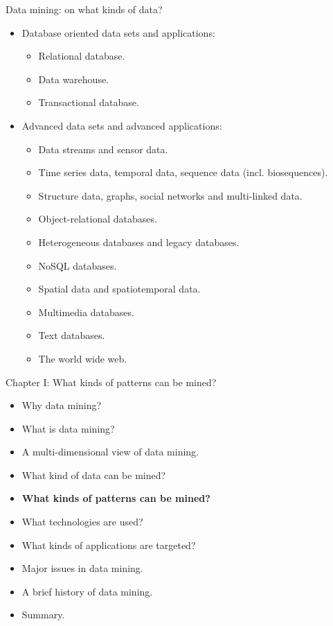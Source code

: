 \documentclass[aspectratio=169,t]{beamer}
\begin{document}
  { 
    \begin{frame}{Data mining: on what kinds of data?}
        \begin{itemize}
            \item Database oriented data sets and applications:
            \begin{itemize}
                \item Relational database.
                \item Data warehouse.
                \item Transactional database.
            \end{itemize}
            \item Advanced data sets and advanced applications:
            \begin{itemize}
                \item Data streams and sensor data.
                \item Time series data, temporal data, sequence data (incl. biosequences).
                \item Structure data, graphs, social networks and multi-linked data.
                \item Object-relational databases.
                \item Heterogeneous databases and legacy databases.
                \item NoSQL databases.
                \item Spatial data and spatiotemporal data.
                \item Multimedia databases.
                \item Text databases.
                \item The world wide web.
            \end{itemize}
        \end{itemize}
    \end{frame}
  }

  { 
    \begin{frame}{Chapter I: What kinds of patterns can be mined?}
        \begin{itemize}
            \item Why data mining?
            \item What is data mining?
            \item A multi-dimensional view of data mining.
            \item What kind of data can be mined?
            \item \textbf{What kinds of patterns can be mined?}
            \item What technologies are used?
            \item What kinds of applications are targeted?
            \item Major issues in data mining.
            \item A brief history of data mining.
            \item Summary.
        \end{itemize}
    \end{frame}
  }
\end{document}
